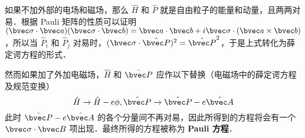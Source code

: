 如果不加外部的电场和磁场，那么 $\hat H$ 和 $\hat P$ 就是自由粒子的能量和动量，且两两对易．根据 Pauli 矩阵的性质可以证明 $(\bvec \sigma\cdot \bvec a)(\bvec \sigma\cdot \bvec b)=\bvec a\cdot \bvec b+i\bvec \sigma\cdot (\bvec a\times \bvec b)$，所以当 $\hat P_i$ 和 $\hat P_j$ 对易时，$(\bvec \sigma\cdot \hat{\bvec P})^2=\hat{\bvec P}^2$，于是上式转化为薛定谔方程的形式．

然而如果加了外加电磁场，$\hat H$ 和 $\hat{\bvec P}$ 应作以下替换（电磁场中的薛定谔方程及规范变换）
\begin{equation}
\hat H\rightarrow \hat H-e\phi, \hat{\bvec P}\rightarrow \hat{\bvec P}-e\hat{\bvec A}
\end{equation}
此时 $\hat{\bvec P}-e\hat{\bvec A}$ 的各个分量间不再对易，因此所得到的方程将会有一个 $\bvec \sigma\cdot \bvec B$ 项出现．最终所得的方程被称为 \textbf{Pauli 方程}．